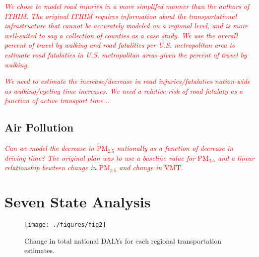 \documentclass{bioinfo}
\newcommand{\col}[2][red]{\textcolor{#1}{#2}}
\newcommand{\pEm}[1]{$\mathrm{PM}_{#1}$}
\newcommand{\vmt}{$\mathrm{VMT}$}
\begin{document}
\begin{methods}
\col[red]{\textit{
We chose to model road injuries in a more simplifed manner than the
authors of ITHIM.  The original ITHIM requires information about the
transportational infrastructure that cannot be accurately modeled on a
regional level, and is more well-suited to say a collection of
counties as a case study. \cite{maizlish2013}  We use the overall percent
of travel by walking and road fatalities per U.S. metropolitan area to
estimate road fatalaties in U.S. metropolitan areas given the percent
of travel by walking. \cite{UWTechReport}
}}

\col[red]{\textit{
We need to estimate the increase/decrease in road injuries/fatalaties
nation-wide as walking/cycling time increases.  We need a relative
risk of road fatalaty as a function of active transport time...
}}

\subsection{Air Pollution}

\col[red]{\textit{
    Can we model the decrease in \pEm{2.5} nationally as a function of
decrease in driving time?  The original plan was to use a baseline
value for \pEm{2.5} and a linear relationship bewteen change in
\pEm{2.5} and change in \vmt{}.
}}

\end{methods}

\section{Seven State Analysis}

\begin{figure}[t]
    \centerline{\texttt{[image: ./figures/fig2]}}
    \caption{Change in total national DALYs for each regional
      transportation estimates.}\label{dalyFigure}
\end{figure}
\end{document}
